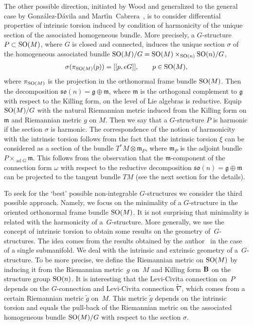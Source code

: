 \documentclass[10pt,a4paper]{amsart}
\numberwithin{equation}{section}
\begin{document}
The other possible direction, initiated by Wood \cite{cw3} and generalized to the general case by Gonz{\'a}lez-D{\'a}vila and Mart{\'{\i}}n~Cabrera~\cite{gmc2}, is to consider dif\/ferential properties of intrinsic torsion induced by condition of harmonicity of the unique section of the associated homogeneous bundle. More precisely, a $G$-structure $P\subset {\rm SO}(M)$, where $G$ is closed and connected, induces the unique section $\sigma$ of the homogeneous associated bundle ${\rm SO}(M)/G={\rm SO}(M)\times_{{\rm SO}(n)} {\rm SO}(n)/G$,
\begin{gather*}
\sigma(\pi_{{\rm SO}(M)}(p))=[[p,eG]],\qquad p\in {\rm SO}(M),
\end{gather*}
where $\pi_{{\rm SO}(M)}$ is the projection in the orthonormal frame bundle ${\rm SO}(M)$. Then the decomposition $\mathfrak{so}(n)=\mathfrak{g}\oplus\mathfrak{m}$, where $\mathfrak{m}$ is the orthogonal complement to $\mathfrak{g}$ with respect to the Killing form, on the level of Lie algebras is reductive. Equip ${\rm SO}(M)/G$ with the natural Riemannian metric induced from the Killing form on $\mathfrak{m}$ and Riemannian metric $g$ on $M$. Then we say that a $G$-structure $P$ is harmonic if the section $\sigma$ is harmonic. The correspondence of the notion of harmonicity with the intrinsic torsion follows from the fact that the intrinsic torsion $\xi$ can be considered as a section of the bundle $T^{\ast}M\otimes\mathfrak{m}_P$, where $\mathfrak{m}_P$ is the adjoint bundle $P\times_{\operatorname{ad}G}\mathfrak{m}$. This follows from the observation that the $\mathfrak{m}$-component of the connection form $\omega$ with respect to the reductive decomposition $\mathfrak{so}(n)=\mathfrak{g}\oplus\mathfrak{m}$ can be projected to the tangent bundle $TM$ (see the next section for the details).

To seek for the `best' possible non-integrable $G$-structures we consider the third possible approach. Namely, we focus on the minimality of a $G$-structure in the oriented orthonormal frame bundle ${\rm SO}(M)$. It is not surprising that minimality is related with the harmonicity of a~$G$-structure. More generally, we use the concept of intrinsic torsion to obtain some results on the geometry of~$G$-structures. The idea comes from the results obtained by the author~\cite{kn} in the case of a single submanifold. We deal with the intrinsic and extrinsic geometry of a~$G$-structure. To be more precise, we def\/ine the Riemannian metric on ${\rm SO}(M)$ by inducing it from the Riemannian metric~$g$ on~$M$ and Killing form ${\bf B}$ on the structure group ${\rm SO}(n)$. It is interesting that the Levi-Civita connection on~$P$ depends on the $G$-connection and Levi-Civita connection $\tilde{\nabla}$, which comes from a certain Riemannian metric $\tilde{g}$ on~$M$. This metric $\tilde{g}$ depends on the intrinsic torsion and equals the pull-back of the Riemannian metric on the associated homogeneous bundle ${\rm SO}(M)/G$ with respect to the section $\sigma$.
\end{document}
